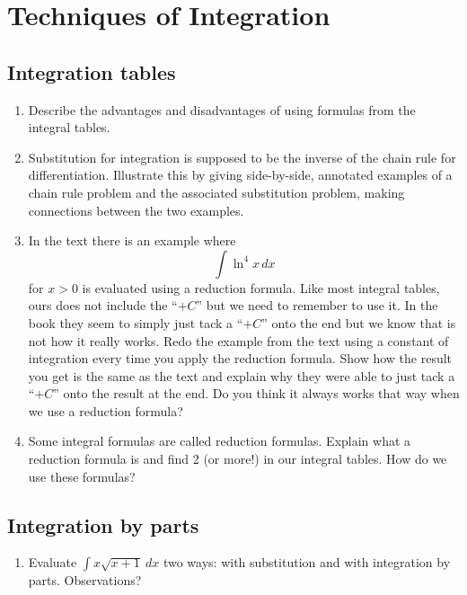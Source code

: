 \chapter{Techniques of Integration} 
\section{Integration tables}
 
\begin{enumerate}

\item  Describe the advantages and disadvantages of using formulas from the integral tables.

\item  Substitution for integration is supposed to be the inverse of the chain rule for differentiation.  Illustrate this by giving side-by-side, annotated examples of a chain rule problem and the associated substitution problem, making connections between the two examples.

\item  In the text there is an example where $$\int {\ln ^4 x\,dx} $$ for $x > 0$ is evaluated using a reduction formula.  Like most integral tables, ours does not include the ``$+ C$''  but we need to remember to use it.  In the book they seem to simply just tack a ``$+ C$''  onto the end but we know that is not how it really works.  Redo the example from the text using a constant of integration every time you apply the reduction formula.  Show how the result you get is the same as the text and explain why they were able to just tack a ``$+ C$''  onto the result at the end.  Do you think it always works that way when we use a reduction formula?

\item  Some integral formulas are called reduction formulas.  Explain what a reduction formula is and find 2 (or more!) in our integral tables.  How do we use these formulas? 

\end{enumerate}\section{Integration by parts}\begin{enumerate}

\item Evaluate $\displaystyle \int x\sqrt{x+1} \ dx$ two ways:  with substitution and with integration by parts.  Observations?


\end{enumerate}
